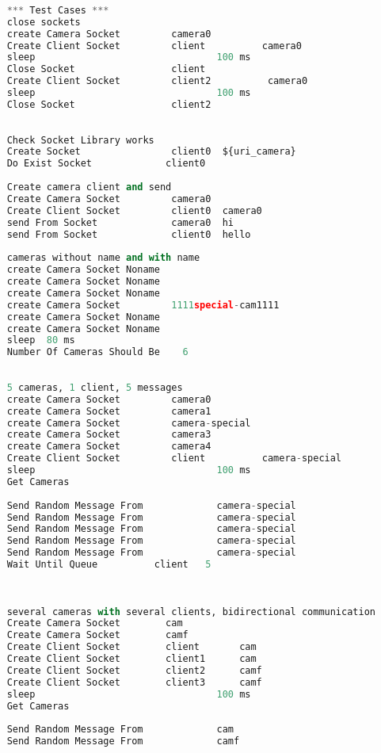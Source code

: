 \documentclass[hidelinks,11pt,a4paper,oneside,article]{memoir}
\begin{document}
\begin{lstlisting}[label={listing:robottest},caption={RobotFramework test file},language=Python, style=styleprogrammingappendix]
    
    *** Test Cases ***
    close sockets
    create Camera Socket         camera0
    Create Client Socket         client          camera0
    sleep                                100 ms
    Close Socket                 client
    Create Client Socket         client2          camera0
    sleep                                100 ms
    Close Socket                 client2
    
    
    Check Socket Library works
    Create Socket                client0  ${uri_camera}
    Do Exist Socket             client0
    
    Create camera client and send
    Create Camera Socket         camera0
    Create Client Socket         client0  camera0
    send From Socket             camera0  hi
    send From Socket             client0  hello
    
    cameras without name and with name
    create Camera Socket Noname
    create Camera Socket Noname
    create Camera Socket Noname
    create Camera Socket         1111special-cam1111
    create Camera Socket Noname
    create Camera Socket Noname
    sleep  80 ms
    Number Of Cameras Should Be    6
    
    
    5 cameras, 1 client, 5 messages
    create Camera Socket         camera0
    create Camera Socket         camera1
    create Camera Socket         camera-special
    create Camera Socket         camera3
    create Camera Socket         camera4
    Create Client Socket         client          camera-special
    sleep                                100 ms
    Get Cameras
    
    Send Random Message From             camera-special
    Send Random Message From             camera-special
    Send Random Message From             camera-special
    Send Random Message From             camera-special
    Send Random Message From             camera-special
    Wait Until Queue          client   5
    
    
    
    several cameras with several clients, bidirectional communication
    Create Camera Socket        cam
    Create Camera Socket        camf
    Create Client Socket        client       cam
    Create Client Socket        client1      cam
    Create Client Socket        client2      camf
    Create Client Socket        client3      camf
    sleep                                100 ms
    Get Cameras
    
    Send Random Message From             cam
    Send Random Message From             camf
    

\end{lstlisting}
\end{document}
